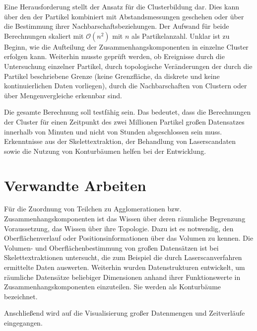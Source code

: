 Eine Herausforderung stellt der Ansatz für die Clusterbildung dar. Dies kann über den  der Partikel kombiniert mit Abstandsmessungen geschehen oder über die Bestimmung ihrer Nachbarschaftsbeziehungen. Der Aufwand für beide Berechnungen skaliert mit $\mathcal{O}(n^2)$ mit $n$ als Partikelanzahl. %
Unklar ist zu Beginn, wie die Aufteilung der Zusammenhangskomponenten in einzelne Cluster erfolgen kann. %
Weiterhin musste geprüft werden, ob Ereignisse durch die Untersuchung einzelner Partikel, durch topologische Veränderungen der durch die Partikel beschriebene Grenze (keine Grenzfläche, da diskrete und keine kontinuierlichen Daten vorliegen), durch die Nachbarschaften von Clustern oder über Mengenvergleiche erkennbar sind.

Die gesamte Berechnung soll testfähig sein. Das bedeutet, dass die Berechnungen der Cluster für einen Zeitpunkt des zwei Millionen Partikel großen Datensatzes innerhalb von Minuten und nicht von Stunden abgeschlossen sein muss. Erkenntnisse aus der Skelettextraktion, der Behandlung von Laserscandaten sowie die Nutzung von Konturbäumen helfen bei der Entwicklung.



\chapter{Verwandte Arbeiten}
Für die Zuordnung von Teilchen zu Agglomerationen bzw. Zusammenhangskomponenten ist das Wissen über deren räumliche Begrenzung Voraussetzung, das Wissen über ihre Topologie. Dazu ist es notwendig, den Oberflächenverlauf oder Positionsinformationen über das Volumen zu kennen. Die Volumen- und Oberflächenbestimmung von großen Datensätzen ist bei Skelettextraktionen untersucht, die zum Beispiel die durch Laserscanverfahren ermittelte Daten auswerten. Weiterhin wurden Datenstrukturen entwickelt, um räumliche Datensätze beliebiger Dimensionen anhand ihrer Funktionswerte in Zusammenhangskomponenten einzuteilen. Sie werden als Konturbäume bezeichnet.

Anschließend wird auf die Visualisierung großer Datenmengen und Zeitverläufe eingegangen.

